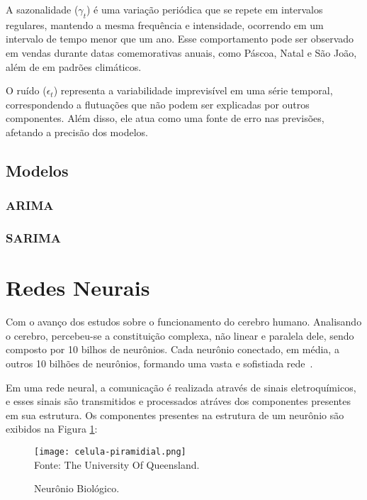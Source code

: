        A sazonalidade ($\gamma_t$) é uma variação periódica que se repete em intervalos regulares, mantendo a mesma frequência e 
        intensidade, ocorrendo em um intervalo de tempo menor que um ano. Esse comportamento pode ser observado em 
        vendas durante datas comemorativas anuais, como Páscoa, Natal e São João, além de em padrões climáticos.
        
        O ruído ($\epsilon_t$) representa a variabilidade imprevisível em uma série temporal, correspondendo a flutuações que não 
        podem ser explicadas por outros componentes. Além disso, ele atua como uma fonte de erro nas previsões, afetando a precisão 
        dos modelos.


    \subsection{Modelos}
        \subsubsection{ARIMA}
        \subsubsection{SARIMA}

\section{Redes Neurais}
    Com o avanço dos estudos sobre o funcionamento do cerebro humano. Analisando o cerebro, percebeu-se a 
    constituição complexa, não linear e paralela dele, sendo composto por 10 bilhos de neurônios.
    Cada neurônio conectado, em média, a outros 10 bilhões de neurônios, formando uma 
    vasta e sofistiada rede~\cite{haykin2009neural}.

    Em uma rede neural, a comunicação é realizada através de sinais eletroquímicos, e esses sinais são transmitidos 
    e processados atráves dos componentes presentes em sua estrutura. Os componentes presentes na estrutura de um neurônio 
    são exibidos na Figura \ref{fig:neuronio_biologico}:
    \begin{figure}[!htb]
        \centering
        \caption{Neurônio Biológico.}
        \texttt{[image: celula-piramidial.png]}\\
        {\footnotesize Fonte: The University Of Queensland.}\
        \label{fig:neuronio_biologico}
    \end{figure}
    
